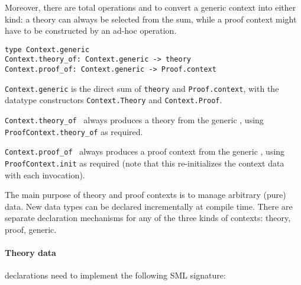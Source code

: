 \begin{isabellebody}
\begin{isamarkuptext}
  Moreover, there are total operations  and  to convert a generic context into either kind: a theory
  can always be selected from the sum, while a proof context might
  have to be constructed by an ad-hoc  operation.%
\end{isamarkuptext}%
\isamarkuptrue%
%
\isadelimmlref
%
\endisadelimmlref
%
\isatagmlref
%
\begin{isamarkuptext}%
\begin{mldecls}
  \verb|type Context.generic| \\
  \verb|Context.theory_of: Context.generic -> theory| \\
  \verb|Context.proof_of: Context.generic -> Proof.context| \\
  \end{mldecls}

  \begin{description}

  \item \verb|Context.generic| is the direct sum of \verb|theory| and \verb|Proof.context|, with the datatype
  constructors \verb|Context.Theory| and \verb|Context.Proof|.

  \item \verb|Context.theory_of|~ always produces a
  theory from the generic , using \verb|ProofContext.theory_of| as required.

  \item \verb|Context.proof_of|~ always produces a
  proof context from the generic , using \verb|ProofContext.init| as required (note that this re-initializes the
  context data with each invocation).

  \end{description}%
\end{isamarkuptext}%
\isamarkuptrue%
%
\endisatagmlref
{\isafoldmlref}%
%
\isadelimmlref
%
\endisadelimmlref
%
\isamarkuptrue%
%
\begin{isamarkuptext}%
The main purpose of theory and proof contexts is to manage
  arbitrary (pure) data.  New data types can be declared incrementally
  at compile time.  There are separate declaration mechanisms for any
  of the three kinds of contexts: theory, proof, generic.

  \paragraph{Theory data} declarations need to implement the following
  SML signature:


\end{isamarkuptext}
\end{isabellebody}
